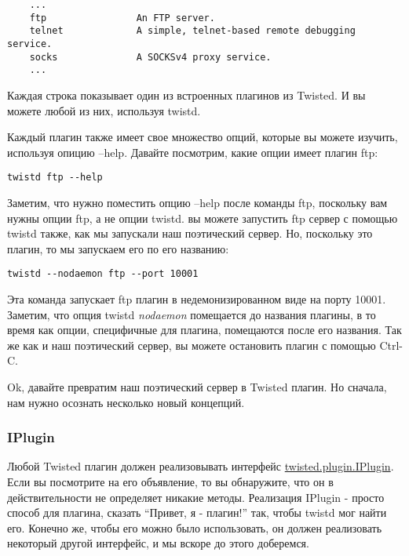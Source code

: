  \begin{verbatim}
    ...
    ftp                An FTP server.
    telnet             A simple, telnet-based remote debugging service.
    socks              A SOCKSv4 proxy service.
    ...
\end{verbatim} 


Каждая строка показывает один из встроенных плагинов из Twisted. 
И вы можете любой из них, используя twistd.


Каждый плагин также имеет свое множество опций, которые вы 
можете изучить, используя опицию --help. Давайте посмотрим, 
какие опции имеет плагин ftp:

 \begin{verbatim}
twistd ftp --help
\end{verbatim} 

Заметим, что нужно поместить опцию --help после команды 
ftp, поскольку вам нужны опции ftp, а не опции twistd.
вы можете запустить ftp сервер с помощью twistd также, 
как мы запускали наш поэтический сервер. Но, поскольку это 
плагин, то мы запускаем его по его названию:

 \begin{verbatim}
twistd --nodaemon ftp --port 10001
\end{verbatim} 


Эта команда запускает ftp плагин в недемонизированном виде 
на порту 10001. Заметим, что опция twistd 
\textit{nodaemon} помещается 
до названия плагины, в то время как опции, специфичные для плагина, 
помещаются после его названия. Так же как и наш поэтический 
сервер, вы можете остановить плагин с помощью Ctrl-C.


Ok, давайте превратим наш поэтический сервер в Twisted 
плагин. Но сначала, нам нужно осознать несколько 
новый концепций.

\subsubsection{IPlugin}

Любой Twisted плагин должен реализовывать интерфейс 
\href{http://twistedmatrix.com/trac/browser/tags/releases/twisted-10.0.0/twisted/plugin.py#L38}{twisted.plugin.IPlugin}. 
Если вы посмотрите на его объявление, то  
вы обнаружите, что он в действительности не определяет никакие методы. 
Реализация IPlugin - просто способ для плагина, сказать ``Привет, я - плагин!'' 
так, чтобы twistd мог найти его. Конечно же, чтобы его можно было использовать,  
он должен реализовать некоторый другой интерфейс, и мы вскоре 
до этого доберемся.


